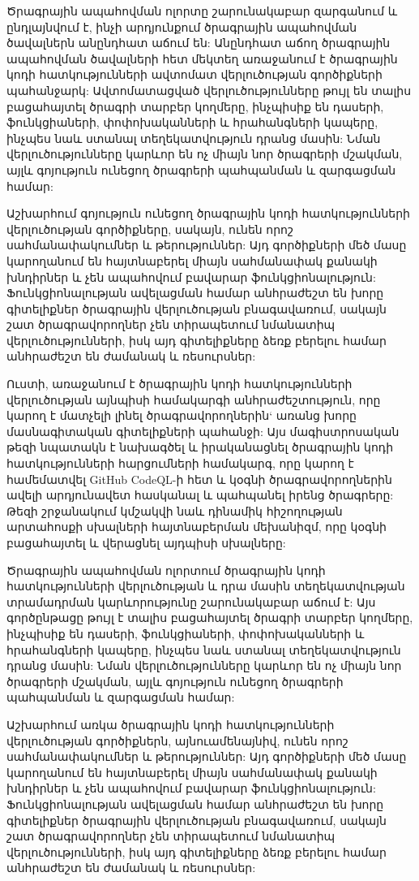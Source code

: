 {
    Ծրագրային ապահովման ոլորտը շարունակաբար զարգանում և ընդլայնվում է, ինչի արդյունքում ծրագրային ապահովման ծավալներն անընդհատ աճում են: Անընդհատ աճող ծրագրային ապահովման ծավալների հետ մեկտեղ առաջանում է ծրագրային կոդի հատկությունների ավտոմատ վերլուծության գործիքների պահանջարկ: Ավտոմատացված վերլուծությունները թույլ են տալիս բացահայտել ծրագրի տարբեր կողմերը, ինչպիսիք են դասերի, ֆունկցիաների, փոփոխականների և հրահանգների կապերը, ինչպես նաև ստանալ տեղեկատվություն դրանց մասին: Նման վերլուծությունները կարևոր են ոչ միայն նոր ծրագրերի մշակման, այլև գոյություն ունեցող ծրագրերի պահպանման և զարգացման համար:

    Աշխարհում գոյություն ունեցող ծրագրային կոդի հատկությունների վերլուծության գործիքները, սակայն, ունեն որոշ սահմանափակումներ և թերություններ: Այդ գործիքների մեծ մասը կարողանում են հայտնաբերել միայն սահմանափակ քանակի խնդիրներ և չեն ապահովում բավարար ֆունկցիոնալություն: Ֆունկցիոնալության ավելացման համար անհրաժեշտ են խորը գիտելիքներ ծրագրային վերլուծության բնագավառում, սակայն շատ ծրագրավորողներ չեն տիրապետում նմանատիպ վերլուծությունների, իսկ այդ գիտելիքները ձեռք բերելու համար անհրաժեշտ են ժամանակ և ռեսուրսներ:

    Ուստի, առաջանում է ծրագրային կոդի հատկությունների վերլուծության այնպիսի համակարգի անհրաժեշտություն, որը կարող է մատչելի լինել ծրագրավորողներին` առանց խորը մասնագիտական գիտելիքների պահանջի: Այս մագիստրոսական թեզի նպատակն է նախագծել և իրականացնել ծրագրային կոդի հատկությունների հարցումների համակարգ, որը կարող է համեմատվել GitHub CodeQL-ի հետ և կօգնի ծրագրավորողներին ավելի արդյունավետ հասկանալ և պահպանել իրենց ծրագրերը: Թեզի շրջանակում կմշակվի նաև դինամիկ հիշողության արտահոսքի սխալների հայտնաբերման մեխանիզմ, որը կօգնի բացահայտել և վերացնել այդպիսի սխալները:

    Ծրագրային ապահովման ոլորտում ծրագրային կոդի հատկությունների վերլուծության և դրա մասին տեղեկատվության տրամադրման կարևորությունը շարունակաբար աճում է: Այս գործընթացը թույլ է տալիս բացահայտել ծրագրի տարբեր կողմերը, ինչպիսիք են դասերի, ֆունկցիաների, փոփոխականների և հրահանգների կապերը, ինչպես նաև ստանալ տեղեկատվություն դրանց մասին: Նման վերլուծությունները կարևոր են ոչ միայն նոր ծրագրերի մշակման, այլև գոյություն ունեցող ծրագրերի պահպանման և զարգացման համար:

    Աշխարհում առկա ծրագրային կոդի հատկությունների վերլուծության գործիքներն, այնուամենայնիվ, ունեն որոշ սահմանափակումներ և թերություններ: Այդ գործիքների մեծ մասը կարողանում են հայտնաբերել միայն սահմանափակ քանակի խնդիրներ և չեն ապահովում բավարար ֆունկցիոնալություն: Ֆունկցիոնալության ավելացման համար անհրաժեշտ են խորը գիտելիքներ ծրագրային վերլուծության բնագավառում, սակայն շատ ծրագրավորողներ չեն տիրապետում նմանատիպ վերլուծությունների, իսկ այդ գիտելիքները ձեռք բերելու համար անհրաժեշտ են ժամանակ և ռեսուրսներ:

}
